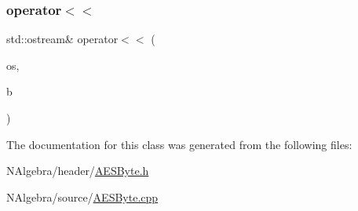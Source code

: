 \mbox{\label{class_a_e_s_byte_a6e506ef4c13b155606735a48f7bb3bb9}} 
\subsubsection{\texorpdfstring{operator$<$$<$}{operator<<}}
{\footnotesize\ttfamily std\+::ostream\& operator$<$$<$ (\begin{DoxyParamCaption}\item[{std\+::ostream \&}]{os,  }\item[{const \mbox{\hyperlink{class_a_e_s_byte}{A\+E\+S\+Byte}} \&}]{b }\end{DoxyParamCaption})\hspace{0.3cm}{\ttfamily [friend]}}



The documentation for this class was generated from the following files\+:\begin{DoxyCompactItemize}
\item 
N\+Algebra/header/\mbox{\hyperlink{_a_e_s_byte_8h}{A\+E\+S\+Byte.\+h}}\item 
N\+Algebra/source/\mbox{\hyperlink{_a_e_s_byte_8cpp}{A\+E\+S\+Byte.\+cpp}}\end{DoxyCompactItemize}

